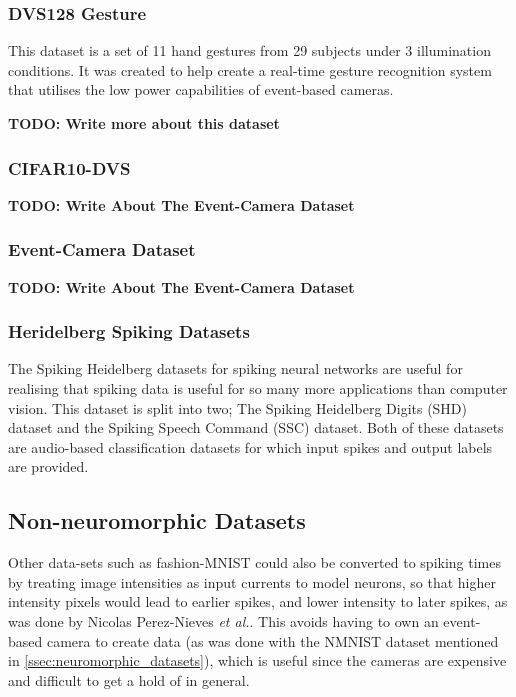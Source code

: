\subsubsection{DVS128 Gesture} \label{sssec:dvs128_gesture}

This dataset is a set of 11 hand gestures from 29 subjects under 3 illumination conditions. It was created to help create a real-time gesture recognition system that utilises the low power capabilities of event-based cameras\cite{DVS128}.

\color{red} \textbf{TODO: Write more about this dataset} \color{black}

\subsubsection{CIFAR10-DVS} \label{sssec:cifar10_dvs}

\color{red} \textbf{TODO: Write About The Event-Camera Dataset} \color{black}

\subsubsection{Event-Camera Dataset} \label{sssec:event_camera_dataset}

\color{red} \textbf{TODO: Write About The Event-Camera Dataset} \color{black}

\subsubsection{Heridelberg Spiking Datasets} \label{sssec:heridelberg_spiking}

The Spiking Heidelberg datasets for spiking neural networks\cite{SpikingHeidelberg} are useful for realising that spiking data is useful for so many more applications than computer vision. This dataset is split into two; The Spiking Heidelberg Digits (SHD) dataset and the Spiking Speech Command (SSC) dataset. Both of these datasets are audio-based classification datasets for which input spikes and output labels are provided.

\subsection{Non-neuromorphic Datasets}

Other data-sets such as fashion-MNIST could also be converted to spiking times by treating image intensities as input currents to model neurons, so that higher intensity pixels would lead to earlier spikes, and lower intensity to later spikes, as was done by Nicolas Perez-Nieves \textit{et al.}\cite{NeuralHetroPromRobLearn}. This avoids having to own an event-based camera to create data (as was done with the NMNIST dataset mentioned in \cref{ssec:neuromorphic_datasets}), which is useful since the cameras are expensive and difficult to get a hold of in general.

